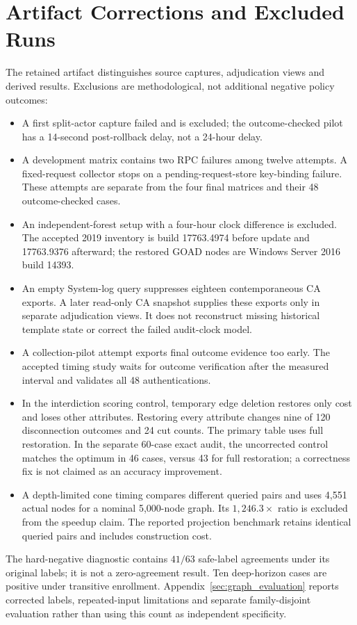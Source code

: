 \section{Artifact Corrections and Excluded Runs}
\label{sec:artifact_corrections}
The retained artifact distinguishes source captures, adjudication views and derived results. Exclusions are methodological, not additional negative policy outcomes:
\begin{itemize}
\item A first split-actor capture failed and is excluded; the outcome-checked pilot has a 14-second post-rollback delay, not a 24-hour delay.
\item A development matrix contains two RPC failures among twelve attempts. A fixed-request collector stops on a pending-request-store key-binding failure. These attempts are separate from the four final matrices and their 48 outcome-checked cases.
\item An independent-forest setup with a four-hour clock difference is excluded. The accepted 2019 inventory is build 17763.4974 before update and 17763.9376 afterward; the restored GOAD nodes are Windows Server 2016 build 14393.
\item An empty System-log query suppresses eighteen contemporaneous CA exports. A later read-only CA snapshot supplies these exports only in separate adjudication views. It does not reconstruct missing historical template state or correct the failed audit-clock model.
\item A collection-pilot attempt exports final outcome evidence too early. The accepted timing study waits for outcome verification after the measured interval and validates all 48 authentications.
\item In the interdiction scoring control, temporary edge deletion restores only cost and loses other attributes. Restoring every attribute changes nine of 120 disconnection outcomes and 24 cut counts. The primary table uses full restoration. In the separate 60-case exact audit, the uncorrected control matches the optimum in 46 cases, versus 43 for full restoration; a correctness fix is not claimed as an accuracy improvement.
\item A depth-limited cone timing compares different queried pairs and uses 4,551 actual nodes for a nominal 5,000-node graph. Its $1,246.3\times$ ratio is excluded from the speedup claim. The reported projection benchmark retains identical queried pairs and includes construction cost.
\end{itemize}
The hard-negative diagnostic contains $41/63$ safe-label agreements under its original labels; it is not a zero-agreement result. Ten deep-horizon cases are positive under transitive enrollment. Appendix~\ref{sec:graph_evaluation} reports corrected labels, repeated-input limitations and separate family-disjoint evaluation rather than using this count as independent specificity.
